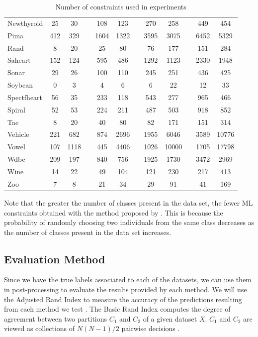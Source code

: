 \documentclass[review]{elsarticle}
\begin{document}
\begin{table}[!h]
{\begin{tabular}{lcc c cc c cc c cc}
		Newthyroid & 25 & 30 && 108 & 123 && 270 & 258 && 449 & 454 \\
		Pima & 412 & 329 && 1604 & 1322 && 3595 & 3075 && 6452 & 5329 \\
		Rand & 8 & 20 && 25 & 80 && 76 & 177 && 151 & 284 \\
		Saheart & 152 & 124 && 595 & 486 && 1292 & 1123 && 2330 & 1948 \\
		Sonar & 29 & 26 && 100 & 110 && 245 & 251 && 436 & 425 \\
		Soybean & 0 & 3 && 4 & 6 && 6 & 22 && 12 & 33 \\
		Spectfheart & 56 & 35 && 233 & 118 && 543 & 277 && 965 & 466 \\
		Spiral & 52 & 53 && 224 & 211 && 487 & 503 && 918 & 852 \\
		Tae & 8 & 20 && 40 & 80 && 82 & 171 && 151 & 314 \\
		Vehicle & 221 & 682 && 874 & 2696 && 1955 & 6046 && 3589 & 10776 \\
		Vowel & 107 & 1118 && 445 & 4406 && 1026 & 10000 && 1705 & 17798 \\
		Wdbc & 209 & 197 && 840 & 756 && 1925 & 1730 && 3472 & 2969 \\
		Wine & 14 & 22 && 49 & 104 && 121 & 230 && 217 & 413 \\
		Zoo & 7 & 8 && 21 & 34 && 29 & 91 && 41 & 169 \\
		\hline

	\end{tabular}}

	\caption{Number of constraints used in experiments}
	\label{tab:constraints}
\end{table}

Note that the greater the number of classes present in the data set, the fewer ML constraints obtained with the method proposed by \cite{wagstaff2001constrained}. This is because the probability of randomly choosing two individuals from the same class decreases as the number of classes present in the data set increases.

\clearpage

\subsection{Evaluation Method}

Since we have the true labels associated to each of the datasets, we can use them in post-processing to evaluate the results provided by each method. We will use the Adjusted Rand Index to measure the accuracy of the predictions resulting from each method we test \cite{hubert1985comparing}. The Basic Rand Index computes the degree of agreement between two partitions $C_1$ and $C_2$ of a given dataset $X$. $C_1$ and $C_2$ are viewed as collections of $N(N - 1)/2$ pairwise decisions \cite{rand1971objective}.
\end{document}
